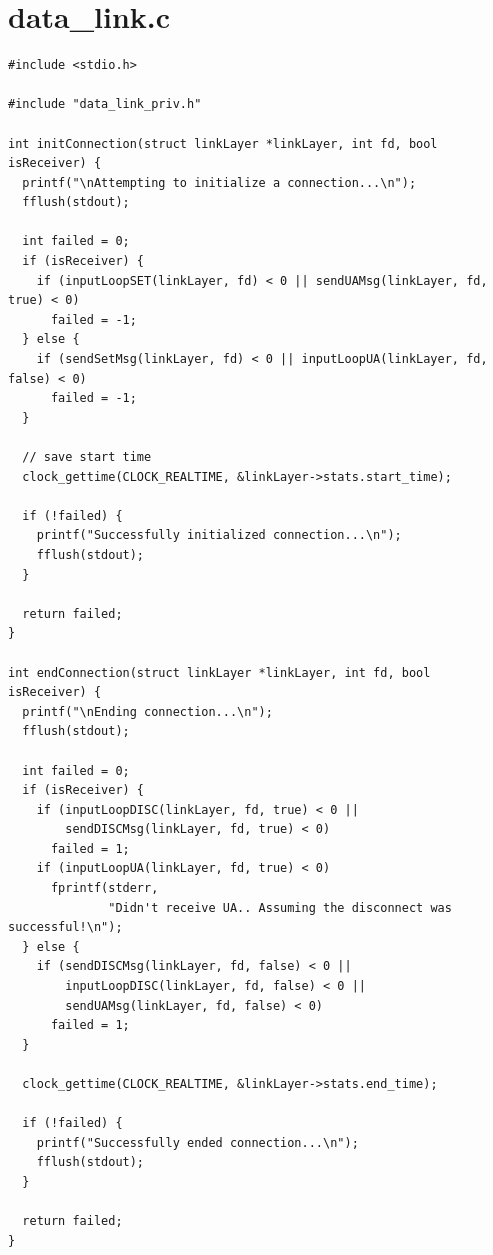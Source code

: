 \documentclass[11pt]{report}
\begin{document}
\section{data\_link.c}

\begin{lstlisting}
#include <stdio.h>

#include "data_link_priv.h"

int initConnection(struct linkLayer *linkLayer, int fd, bool isReceiver) {
  printf("\nAttempting to initialize a connection...\n");
  fflush(stdout);

  int failed = 0;
  if (isReceiver) {
    if (inputLoopSET(linkLayer, fd) < 0 || sendUAMsg(linkLayer, fd, true) < 0)
      failed = -1;
  } else {
    if (sendSetMsg(linkLayer, fd) < 0 || inputLoopUA(linkLayer, fd, false) < 0)
      failed = -1;
  }

  // save start time
  clock_gettime(CLOCK_REALTIME, &linkLayer->stats.start_time);

  if (!failed) {
    printf("Successfully initialized connection...\n");
    fflush(stdout);
  }

  return failed;
}

int endConnection(struct linkLayer *linkLayer, int fd, bool isReceiver) {
  printf("\nEnding connection...\n");
  fflush(stdout);

  int failed = 0;
  if (isReceiver) {
    if (inputLoopDISC(linkLayer, fd, true) < 0 ||
        sendDISCMsg(linkLayer, fd, true) < 0)
      failed = 1;
    if (inputLoopUA(linkLayer, fd, true) < 0)
      fprintf(stderr,
              "Didn't receive UA.. Assuming the disconnect was successful!\n");
  } else {
    if (sendDISCMsg(linkLayer, fd, false) < 0 ||
        inputLoopDISC(linkLayer, fd, false) < 0 ||
        sendUAMsg(linkLayer, fd, false) < 0)
      failed = 1;
  }

  clock_gettime(CLOCK_REALTIME, &linkLayer->stats.end_time);

  if (!failed) {
    printf("Successfully ended connection...\n");
    fflush(stdout);
  }

  return failed;
}


\end{lstlisting}
\end{document}
